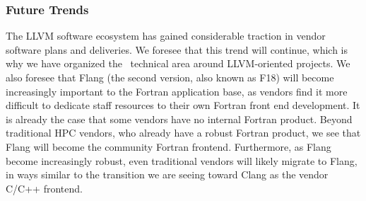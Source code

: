 \subsubsection{Future Trends}
The LLVM software ecosystem has gained considerable traction in  vendor software plans and deliveries. We foresee that this trend will continue, which is why we have organized the \tools\ technical area around LLVM-oriented projects.  We also foresee that Flang (the second version, also known as F18) will become increasingly important to the Fortran application base, as vendors find it more difficult to dedicate staff resources to their own Fortran front end development.  It is already the case that some vendors have no internal Fortran product.  Beyond traditional HPC vendors, who already have a robust Fortran product, we see that Flang will become the community Fortran frontend.  Furthermore, as Flang become increasingly robust, even traditional vendors will likely migrate to Flang, in ways similar to the transition we are seeing toward Clang as the vendor C/C++ frontend.
